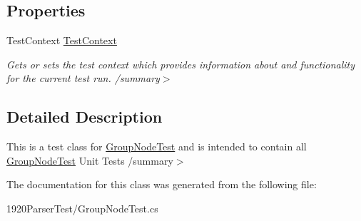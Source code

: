 \subsection*{Properties}
\begin{DoxyCompactItemize}
\item 
Test\+Context \hyperlink{class__1920_parser_test_1_1_group_node_test_abc5b4617a242e194056eaf7d5a2d28f8}{Test\+Context}\hypertarget{class__1920_parser_test_1_1_group_node_test_abc5b4617a242e194056eaf7d5a2d28f8}{}\label{class__1920_parser_test_1_1_group_node_test_abc5b4617a242e194056eaf7d5a2d28f8}

\begin{DoxyCompactList}\small\item\em Gets or sets the test context which provides information about and functionality for the current test run. /summary$>$ \end{DoxyCompactList}\end{DoxyCompactItemize}


\subsection{Detailed Description}
This is a test class for \hyperlink{class__1920_parser_test_1_1_group_node_test}{Group\+Node\+Test} and is intended to contain all \hyperlink{class__1920_parser_test_1_1_group_node_test}{Group\+Node\+Test} Unit Tests /summary$>$ 

The documentation for this class was generated from the following file\+:\begin{DoxyCompactItemize}
\item 
1920\+Parser\+Test/Group\+Node\+Test.\+cs\end{DoxyCompactItemize}
